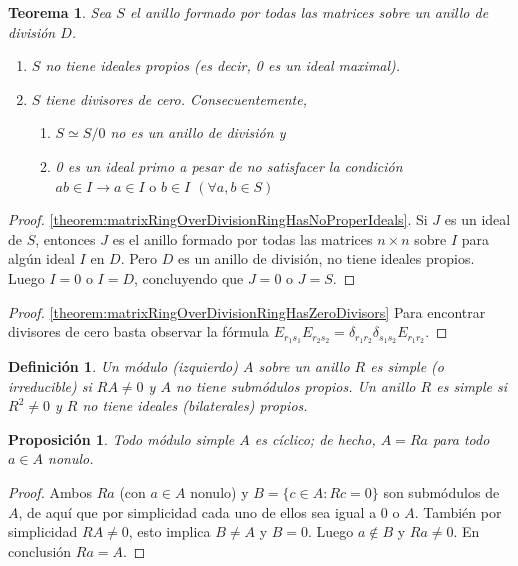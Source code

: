 \documentclass{report}
\newtheorem{theorem}{Teorema}
\newtheorem{proposition}{Proposición}
\newtheorem{definition}{Definición}
\begin{document}
  \begin{theorem}
    Sea \(S\) el anillo formado por todas las matrices sobre un anillo de división \(D\).
    \begin{enumerate}
      \item
        \label{theorem:matrixRingOverDivisionRingHasNoProperIdeals}
        \(S\) no tiene ideales propios (es decir, 0 es un ideal maximal).
      \item \label{theorem:matrixRingOverDivisionRingHasZeroDivisors} \(S\) tiene divisores de cero.
      Consecuentemente,
      \begin{enumerate}
        \item \(S \simeq S / 0\) no es un anillo de división y
        \item 0 es un ideal primo a pesar de no satisfacer la condición \(a b \in I \rightarrow {a \in I} \text{ o } {b \in I}\) \((\forall a, b \in S)\)
      \end{enumerate}
    \end{enumerate}
  \end{theorem}
  \begin{proof} \ref{theorem:matrixRingOverDivisionRingHasNoProperIdeals}.
    Si \(J\) es un ideal de \(S\), entonces \(J\) es el anillo formado por todas las matrices \(n \times n\) sobre \(I\) para algún ideal \(I\) en \(D\).
    Pero \(D\) es un anillo de división, no tiene ideales propios.
    Luego \(I = 0\) o \(I = D\), concluyendo que \(J = 0\) o \(J = S\).
  \end{proof}
  \begin{proof} \ref{theorem:matrixRingOverDivisionRingHasZeroDivisors}
    Para encontrar divisores de cero basta observar la fórmula \(E_{r_1 s_1} E_{r_2 s_2} = \delta_{r_1 r_2} \delta_{s_1 s_2} E_{r_1 r_2}\).
  \end{proof}


  \begin{definition}
    Un módulo (izquierdo) \(A\) sobre un anillo \(R\) es \emph{simple} (o \emph{irreducible}) si \(R A \neq 0\) y \(A\) no tiene submódulos propios.
    Un anillo \(R\) es \emph{simple} si \(R^2 \neq 0\) y \(R\) no tiene ideales (bilaterales) propios.
  \end{definition}

  \begin{proposition}
    Todo módulo simple \(A\) es cíclico; de hecho, \(A = R a\) para todo \(a \in A\) nonulo.
  \end{proposition}
  \begin{proof}
    Ambos \(Ra\) (con \(a \in A\) nonulo) y \(B = \{c \in A : R c = 0\}\) son submódulos de \(A\), de aquí que por simplicidad cada uno de ellos sea igual a 0 o \(A\).
    También por simplicidad \(R A \neq 0\), esto implica \(B \neq A\) y \(B = 0\).
    Luego \(a \notin B\) y \(R a \neq 0\).
    En conclusión \(R a = A\).
  \end{proof}
\end{document}
